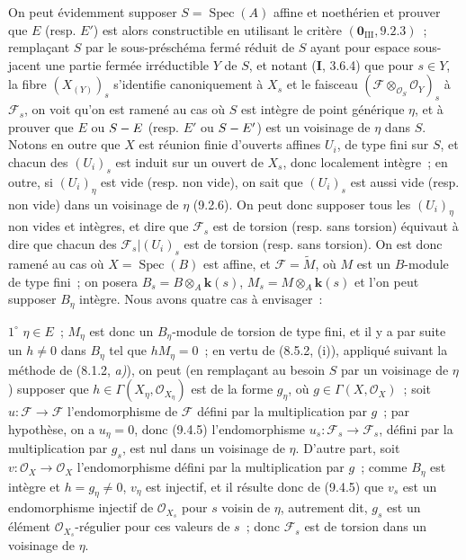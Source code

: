 On peut évidemment supposer $S=\operatorname{Spec}(A)$ affine et noethérien et
prouver que $E$ (resp. $E'$) est alors constructible en utilisant le critère
$(\mathbf 0_{\mathrm{III}},9.2.3)$~; remplaçant $S$ par le sous-préschéma fermé
réduit de $S$ ayant pour espace sous-jacent une partie fermée irréductible $Y$
de $S$, et notant (\textbf{I}, 3.6.4) que pour $s\in Y$, la fibre
$(X_{(Y)})_s$ s'identifie canoniquement à $X_s$ et le faisceau
$(\mathcal F\otimes_{\mathcal O_S}\mathcal O_Y)_s$ à $\mathcal F_s$, on voit
qu'on est ramené au cas où $S$ est intègre de point générique $\eta$, et à
prouver que $E$ ou $S- E$ (resp. $E'$ ou $S- E'$) est un voisinage de $\eta$
dans $S$. Notons en outre que $X$ est réunion finie d'ouverts affines $U_i$,
de type fini sur $S$, et chacun des $(U_i)_s$ est induit sur un ouvert de
$X_s$, donc localement intègre~; en outre, si $(U_i)_\eta$ est vide (resp. non
vide), on sait que $(U_i)_s$ est aussi vide (resp. non vide) dans un voisinage
de $\eta$ (9.2.6). On peut donc supposer tous les $(U_i)_\eta$ non vides et
intègres, et dire que $\mathcal F_s$ est de torsion (resp. sans torsion)
équivaut à dire que chacun des $\mathcal F_s|(U_i)_s$ est de torsion (resp.
sans torsion). On est donc ramené au cas où $X=\operatorname{Spec}(B)$ est
affine, et $\mathcal F=\widetilde M$, où $M$ est un $B$-module de type fini~;
on posera $B_s=B\otimes_A \boldsymbol{k}(s)$, $M_s=M\otimes_A \boldsymbol{k}(s)$ et l'on peut supposer
$B_\eta$ intègre. Nous avons quatre cas à envisager~:

$1^\circ$ $\eta\in E$~; $M_\eta$ est donc un $B_\eta$-module de torsion de
type fini, et il y a par suite un $h\neq0$ dans $B_\eta$ tel que
$hM_\eta=0$~; en vertu de (8.5.2, (i)), appliqué suivant la méthode
de (8.1.2, \emph{a)}), on peut (en remplaçant au besoin $S$ par un voisinage
de $\eta$) supposer que $h\in\Gamma(X_\eta,\mathcal O_{X_\eta})$ est de la
forme $g_\eta$, où $g\in\Gamma(X,\mathcal O_X)$~; soit
$u:\mathcal F\to\mathcal F$ l'endomorphisme de $\mathcal F$ défini par la
multiplication par $g$~; par hypothèse, on a $u_\eta=0$, donc (9.4.5)
l'endomorphisme $u_s:\mathcal F_s\to\mathcal F_s$, défini par la multiplication
par $g_s$, est nul dans un voisinage de $\eta$. D'autre part, soit
$v:\mathcal O_X\to\mathcal O_X$ l'endomorphisme défini par la multiplication
par $g$~; comme $B_\eta$ est intègre et $h=g_\eta\neq0$, $v_\eta$ est injectif,
et il résulte donc de (9.4.5) que $v_s$ est un endomorphisme injectif de
$\mathcal O_{X_s}$ pour $s$ voisin de $\eta$, autrement dit, $g_s$ est un
élément $\mathcal O_{X_s}$-régulier pour ces valeurs de $s$~; donc
$\mathcal F_s$ est de torsion dans un voisinage de $\eta$.

